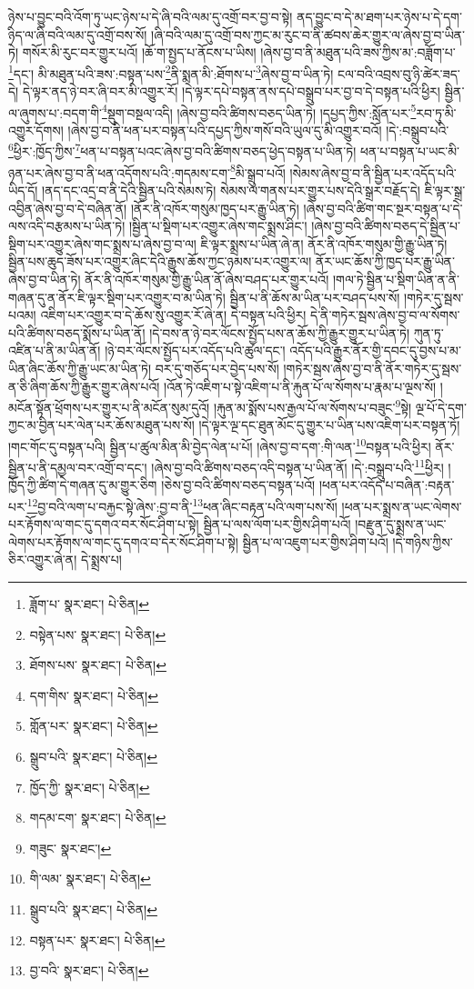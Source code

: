 ཉེས་པ་བྱུང་བའི་འོག་ཏུ་ཡང་ཉེས་པ་དེ་ཞི་བའི་ལམ་དུ་འགྲོ་བར་བྱ་བ་སྟེ། ནད་བྱུང་བ་དེ་མ་ཐག་པར་ཉེས་པ་དེ་དག་ཉིད་ལ་ཞི་བའི་ལམ་དུ་འགྲོ་བས་སོ། །ཞི་བའི་ལམ་དུ་འགྲོ་བས་ཀྱང་མ་རུང་བ་ནི་ཚབས་ཆེར་གྱུར་ལ་ཞེས་བྱ་བ་ཡིན་ཏེ། གསོར་མི་རུང་བར་གྱུར་པའོ། །ཆོ་ག་སྤྱད་པ་ནོངས་པ་ཡིས། །ཞེས་བྱ་བ་ནི་མཐུན་པའི་ཟས་ཀྱིས་མ་:བཟློག་པ་\footnote{ཟློག་པ་  སྣར་ཐང་།  པེ་ཅིན། }དང་། མི་མཐུན་པའི་ཟས་:བསྟན་པས་\footnote{བསྟེན་པས་  སྣར་ཐང་།  པེ་ཅིན། }ནི་སྨན་མི་:ཐོགས་པ་\footnote{ཐོགས་པས་  སྣར་ཐང་།  པེ་ཅིན། }ཞེས་བྱ་བ་ཡིན་ཏེ། ངལ་བའི་འབྲས་བུ་ཉི་ཚེར་ཟད་དེ། དེ་ལྟར་ནད་ཉེ་བར་ཞི་བར་མི་འགྱུར་རོ། །དེ་ལྟར་དཔེ་བསྟན་ནས་དཔེ་བསྒྲུབ་པར་བྱ་བ་དེ་བསྟན་པའི་ཕྱིར། སྦྱིན་ལ་ཞུགས་པ་:བདག་གི་\footnote{དག་གིས་  སྣར་ཐང་།  པེ་ཅིན། }སྡུག་བསྔལ་འདི། །ཞེས་བྱ་བའི་ཚིགས་བཅད་ཡིན་ཏེ། །དཔྱད་ཀྱིས་:སློན་པར་\footnote{གློན་པར་  སྣར་ཐང་།  པེ་ཅིན། }རབ་ཏུ་མི་འགྱུར་དོགས། །ཞེས་བྱ་བ་ནི་ཕན་པར་བསྟན་པའི་དཔྱད་ཀྱིས་གསོ་བའི་ཡུལ་དུ་མི་འགྱུར་བའོ། །དེ་:བསྒྲུབ་པའི་\footnote{སྒྲུབ་པའི་  སྣར་ཐང་།  པེ་ཅིན། }ཕྱིར་:ཁྱོད་ཀྱིས་\footnote{ཁྱོད་ཀྱི་  སྣར་ཐང་།  པེ་ཅིན། }ཕན་པ་བསྟན་པའང་ཞེས་བྱ་བའི་ཚིགས་བཅད་ཕྱེད་བསྟན་པ་ཡིན་ཏེ། ཕན་པ་བསྟན་པ་ཡང་མི་ཉན་པར་ཞེས་བྱ་བ་ནི་ཕན་འདོགས་པའི་:གདམས་ངག་\footnote{གདམ་ངག་  སྣར་ཐང་།  པེ་ཅིན། }མི་སྒྲུབ་པའོ། །སེམས་ཞེས་བྱ་བ་ནི་སྦྱིན་པར་འདོད་པའི་ཡིད་དོ། །ནད་དང་འདྲ་བ་ནི་དེའི་སྦྱིན་པའི་སེམས་ཏེ། སེམས་ལ་གནས་པར་གྱུར་པས་དེའི་སྒྲར་བརྗོད་དེ། ཇི་ལྟར་སྒྲ་འབྱིན་ཞེས་བྱ་བ་དེ་བཞིན་ནོ། །ནོར་ནི་འཁོར་གསུམ་ཁྱད་པར་རྒྱུ་ཡིན་ཏེ། །ཞེས་བྱ་བའི་ཚིག་གང་སྔར་བསྟན་པ་དེ་ལས་འདི་བརྩམས་པ་ཡིན་ཏེ། །སྦྱིན་པ་སྡིག་པར་འགྱུར་ཞེས་གང་སྨྲས་ཤིང་། །ཞེས་བྱ་བའི་ཚིགས་བཅད་དེ་སྦྱིན་པ་སྡིག་པར་འགྱུར་ཞེས་གང་སྨྲས་པ་ཞེས་བྱ་བ་ལ། ཇི་ལྟར་སྨྲས་པ་ཡིན་ཞེ་ན། ནོར་ནི་འཁོར་གསུམ་གྱི་རྒྱུ་ཡིན་ཏེ། སྦྱིན་པས་ཆུད་ཟོས་པར་འགྱུར་ཞིང་དེའི་རྒྱུས་ཆོས་ཀྱང་ཉམས་པར་འགྱུར་ལ། ནོར་ཡང་ཆོས་ཀྱི་ཁྱད་པར་རྒྱུ་ཡིན་ཞེས་བྱ་བ་ཡིན་ཏེ། ནོར་ནི་འཁོར་གསུམ་གྱི་རྒྱུ་ཡིན་ནོ་ཞེས་བཤད་པར་གྱུར་པའོ། །གལ་ཏེ་སྦྱིན་པ་སྡིག་ཡིན་ན་ནི་གཞན་དུ་ན་ནོར་ཇི་ལྟར་སྡིག་པར་འགྱུར་བ་མ་ཡིན་ཏེ། སྦྱིན་པ་ནི་ཆོས་མ་ཡིན་པར་བཤད་པས་སོ། །གཏེར་དུ་སྦས་པའམ། འཇིག་པར་འགྱུར་བ་དེ་ཆོས་སུ་འགྱུར་རོ་ཞེ་ན། དེ་བསྟན་པའི་ཕྱིར། དེ་ནི་གཏེར་སྦས་ཞེས་བྱ་བ་ལ་སོགས་པའི་ཚིགས་བཅད་སྨོས་པ་ཡིན་ནོ། །དེ་བས་ན་ཉེ་བར་ལོངས་སྤྱོད་པས་ན་ཆོས་ཀྱི་རྒྱུར་གྱུར་པ་ཡིན་ཏེ། ཀུན་ཏུ་འཛིན་པ་ནི་མ་ཡིན་ནོ། །ཉེ་བར་ལོངས་སྤྱོད་པར་འདོད་པའི་ཚུལ་དང་། འདོད་པའི་རྒྱུར་ནོར་གྱི་དབང་དུ་བྱས་པ་མ་ཡིན་ཞིང་ཆོས་ཀྱི་རྒྱུ་ཡང་མ་ཡིན་ཏེ། བར་དུ་གཅོད་པར་བྱེད་པས་སོ། །གཏེར་སྦས་ཞེས་བྱ་བ་ནི་ནོར་གཏེར་དུ་སྦས་ན་ཅི་ཞིག་ཆོས་ཀྱི་རྒྱུར་གྱུར་ཞེས་པའོ། །འོན་ཏེ་འཇིག་པ་སྟེ་འཇིག་པ་ནི་རྐུན་པོ་ལ་སོགས་པ་རྣམ་པ་ལྔས་སོ། །མངོན་སྟོན་ཕྲོགས་པར་གྱུར་པ་ནི་མངོན་སུམ་དུའོ། །རྐུན་མ་སྨོས་པས་རྒྱལ་པོ་ལ་སོགས་པ་བཟུང་\footnote{གཟུང་  སྣར་ཐང་། }སྟེ། ལྔ་པོ་དེ་དག་ཀྱང་མ་བྱིན་པར་ལེན་པར་ཆོས་མཐུན་པས་སོ། །དེ་ལྟར་ལྔ་དང་ཐུན་མོང་དུ་གྱུར་པ་ཡིན་པས་འཇིག་པར་བསྟན་ཏོ། །གང་གོང་དུ་བསྟན་པའི། སྦྱིན་པ་ཚུལ་མིན་མི་བྱེད་ལེན་པ་པོ། །ཞེས་བྱ་བ་དག་:གི་ལན་\footnote{གི་ལམ་  སྣར་ཐང་།  པེ་ཅིན། }བསྟན་པའི་ཕྱིར། ནོར་སྦྱིན་པ་ནི་དམྱལ་བར་འགྲོ་བ་དང་། །ཞེས་བྱ་བའི་ཚིགས་བཅད་འདི་བསྟན་པ་ཡིན་ནོ། །དེ་:བསྒྲུབ་པའི་\footnote{སྒྲུབ་པའི་  སྣར་ཐང་།  པེ་ཅིན། }ཕྱིར། །ཁྱོད་ཀྱི་ཚིག་དེ་གཞན་དུ་མ་གྱུར་ཅིག །ཅེས་བྱ་བའི་ཚིགས་བཅད་བསྟན་པའོ། །ཕན་པར་འདོད་པ་བཞིན་:བརྟན་པར་\footnote{བསྟན་པར་  སྣར་ཐང་།  པེ་ཅིན། }བྱ་བའི་ལག་པ་བརྐྱང་སྟེ་ཞེས་:བྱ་བ་ནི་\footnote{བྱ་བའི་  སྣར་ཐང་།  པེ་ཅིན། }ཕན་ཞིང་བརྟན་པའི་ལག་པས་སོ། །ཕན་པར་སྨྲས་ན་ཡང་ལེགས་པར་རྟོགས་ལ་གང་དུ་དགའ་བར་སོང་ཤིག་པ་སྟེ། སྦྱིན་པ་ལས་ལོག་པར་གྱིས་ཤིག་པའོ། །བརྫུན་དུ་སྨྲས་ན་ཡང་ལེགས་པར་རྟོགས་ལ་གང་དུ་དགའ་བ་དེར་སོང་ཤིག་པ་སྟེ། སྦྱིན་པ་ལ་འཇུག་པར་གྱིས་ཤིག་པའོ། །དེ་གཉིས་ཀྱིས་ཅིར་འགྱུར་ཞེ་ན། དེ་སྨྲས་པ། 